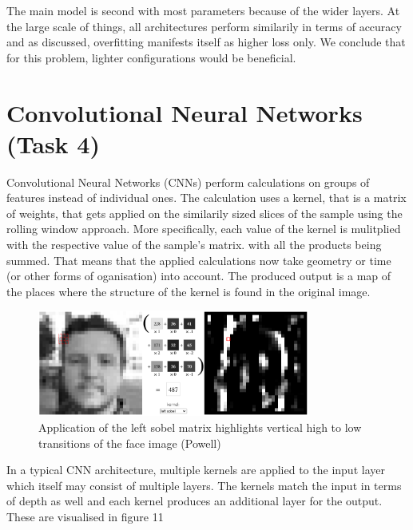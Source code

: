 \documentclass{article}
\begin{document}
The main model is second with most parameters because of the wider layers.
At the large scale of things, all architectures perform similarily in terms of accuracy and as discussed, overfitting manifests itself as higher loss only.
We conclude that for this problem, lighter configurations would be beneficial.

\section{Convolutional Neural Networks (Task 4)}

Convolutional Neural Networks (CNNs) perform calculations on groups of features instead of individual ones.
The calculation uses a kernel, that is a matrix of weights, that gets applied on the similarily sized slices of the sample using the rolling window approach.
More specifically, each value of the kernel is mulitplied with the respective value of the sample's matrix. with all the products being summed.
That means that the applied calculations now take geometry or time (or other forms of oganisation) into account.
The produced output is a map of the places where the structure of the kernel is found in the original image.

\begin{figure}[h!]
    \centering
    \includegraphics[width=0.8\textwidth]{./plots/screenshot6.png}
    \caption{Application of the left sobel matrix highlights vertical high to low transitions of the face image (Powell)}
    \label{fig:plot10}
\end{figure}

In a typical CNN architecture, multiple kernels are applied to the input layer which itself may consist of multiple layers.
The kernels match the input in terms of depth as well and each kernel produces an additional layer for the output. These are visualised in figure 11
\end{document}
